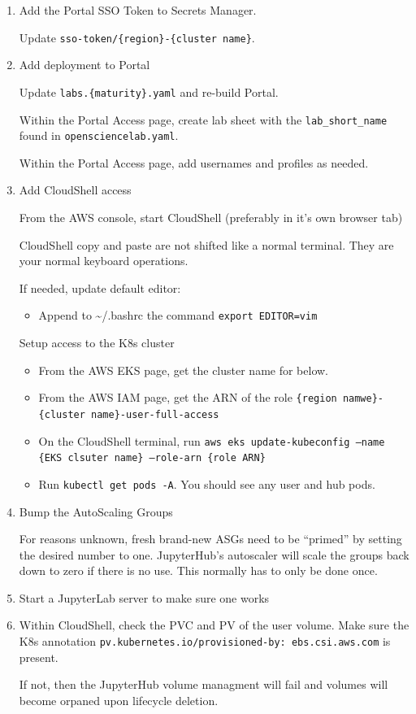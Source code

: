 \begin{enumerate}
\item Add the Portal SSO Token to Secrets Manager.

Update \texttt{sso-token/\{region\}-\{cluster name\}}.


\item Add deployment to Portal

Update \texttt{labs.\{maturity\}.yaml} and re-build Portal.

Within the Portal Access page, create lab sheet with the \texttt{lab\_short\_name} found in \texttt{opensciencelab.yaml}.

Within the Portal Access page, add usernames and profiles as needed.


\item Add CloudShell access

From the AWS console, start CloudShell (preferably in it's own browser tab)

CloudShell copy and paste are not shifted like a normal terminal. They are your normal keyboard operations.

If needed, update default editor:

\begin{itemize}
\item Append to {\textasciitilde}/.bashrc the command \texttt{export EDITOR=vim}
\end{itemize}

Setup access to the K8s cluster

\begin{itemize}
\item From the AWS EKS page, get the cluster name for below.


\item From the AWS IAM page, get the ARN of the role \texttt{\{region namwe\}-\{cluster name\}-user-full-access}


\item On the CloudShell terminal, run \texttt{aws eks update-kubeconfig --name \{EKS clsuter name\} --role-arn \{role ARN\}}


\item Run \texttt{kubectl get pods -A}. You should see any user and hub pods.
\end{itemize}


\item Bump the AutoScaling Groups

For reasons unknown, fresh brand-new ASGs need to be ``primed'' by setting the desired number to one. JupyterHub's autoscaler will scale the groups back down to zero if there is no use. This normally has to only be done once.


\item Start a JupyterLab server to make sure one works


\item Within CloudShell, check the PVC and PV of the user volume. Make sure the K8s annotation \texttt{pv.kubernetes.io/provisioned-by: ebs.csi.aws.com} is present.

If not, then the JupyterHub volume managment will fail and volumes will become orpaned upon lifecycle deletion.
\end{enumerate}

